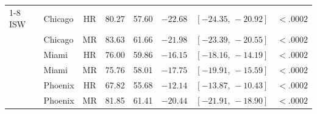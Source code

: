 \begin{table}[h]
\begin{tabular}{@{}llcrrrcr@{}}
\cmidrule(l){1-8}
ISW       & Chicago & HR & 80.27 & 57.60 & $-22.68$ & $[-24.35,\,-20.92]$ & $<\!.0002$ \\
          & Chicago & MR & 83.63 & 61.66 & $-21.98$ & $[-23.39,\,-20.55]$ & $<\!.0002$ \\
          & Miami   & HR & 76.00 & 59.86 & $-16.15$ & $[-18.16,\,-14.19]$ & $<\!.0002$ \\
          & Miami   & MR & 75.76 & 58.01 & $-17.75$ & $[-19.91,\,-15.59]$ & $<\!.0002$ \\
          & Phoenix & HR & 67.82 & 55.68 & $-12.14$ & $[-13.87,\,-10.43]$ & $<\!.0002$ \\
          & Phoenix & MR & 81.85 & 61.41 & $-20.44$ & $[-21.91,\,-18.90]$ & $<\!.0002$ \\
\bottomrule
\end{tabular}
\end{table}

\clearpage

